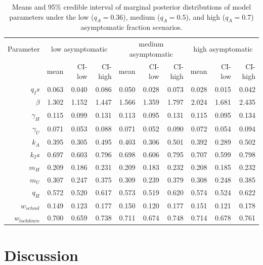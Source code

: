 \documentclass[11pt]{article}
\begin{document}
\begin{spacing}{1.25}
\begin{table}
	\centering
	\caption{Means and 95\% credible interval of marginal posterior distributions of model parameters under the low ($q_A = 0.36$), medium ($q_A = 0.5$), and high ($q_A = 0.7$) asymptomatic fraction scenarios.}
	\begin{tabular}{rrrrrrrrrr}
		\hline
		Parameter & \multicolumn{3}{c}{low asymptomatic} & \multicolumn{3}{c}{medium asymptomatic} & \multicolumn{3}{c}{high asymptomatic} \\
		{} & mean & CI-low & CI-high & mean & CI-low & CI-high & mean & CI-low & CI-high \\ 
		\hline
	$q_Is$ & 0.063 & 0.040 & 0.086 & 0.050 & 0.028 & 0.073 & 0.028 & 0.015 & 0.042 \\ 
	$\beta$ & 1.302 & 1.152 & 1.447 & 1.566 & 1.359 & 1.797 & 2.024 & 1.681 & 2.435 \\ 
	$\gamma_H$ & 0.115 & 0.099 & 0.131 & 0.113 & 0.095 & 0.131 & 0.115 & 0.095 & 0.134 \\ 
	$\gamma_U$ & 0.071 & 0.053 & 0.088 & 0.071 & 0.052 & 0.090 & 0.072 & 0.054 & 0.094 \\ 
	$k_A$ & 0.395 & 0.305 & 0.495 & 0.403 & 0.306 & 0.501 & 0.392 & 0.289 & 0.502 \\ 
	$k_Is$ & 0.697 & 0.603 & 0.796 & 0.698 & 0.606 & 0.795 & 0.707 & 0.599 & 0.798 \\ 
	$m_H$ & 0.209 & 0.186 & 0.231 & 0.209 & 0.183 & 0.232 & 0.208 & 0.185 & 0.232 \\ 
	$m_U$ & 0.307 & 0.247 & 0.375 & 0.309 & 0.239 & 0.379 & 0.308 & 0.248 & 0.385 \\ 
	$q_H$ & 0.572 & 0.520 & 0.617 & 0.573 & 0.519 & 0.620 & 0.574 & 0.524 & 0.622 \\ 
	$w_{school}$ & 0.149 & 0.123 & 0.177 & 0.150 & 0.120 & 0.177 & 0.151 & 0.121 & 0.178 \\ 
	$w_{lockdown}$ & 0.700 & 0.659 & 0.738 & 0.711 & 0.674 & 0.748 & 0.714 & 0.678 & 0.761 \\ 
		\hline
	\end{tabular}
\label{tbl:posterior}
\end{table}
\end{spacing}



\section{Discussion}
\end{document}
